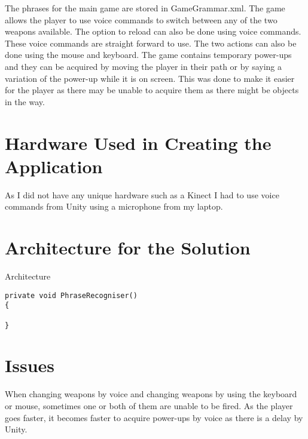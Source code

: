\documentclass{article}
\begin{document}
The phrases for the main game are stored in GameGrammar.xml. The game allows the player to use voice commands to switch between any of the two weapons available. The option to reload can also be done using voice commands. These voice commands are straight forward to use. The two actions can also be done using the mouse and keyboard. The game contains temporary power-ups and they can be acquired by moving the player in their path or by saying a variation of the power-up while it is on screen. This was done to make it easier for the player as there may be unable to acquire them as there might be objects in the way.

\section{Hardware Used in Creating the Application}
As I did not have any unique hardware such as a Kinect I had to use voice commands from Unity using a microphone from my laptop.

\section{Architecture for the Solution}
Architecture
\begin{verbatim}
private void PhraseRecogniser()
{

}
\end{verbatim}


\section{Issues}
When changing weapons by voice and changing weapons by using the keyboard or mouse, sometimes one or both of them are unable to be fired. As the player goes faster, it becomes faster to acquire power-ups by voice as there is a delay by Unity.
\end{document}
